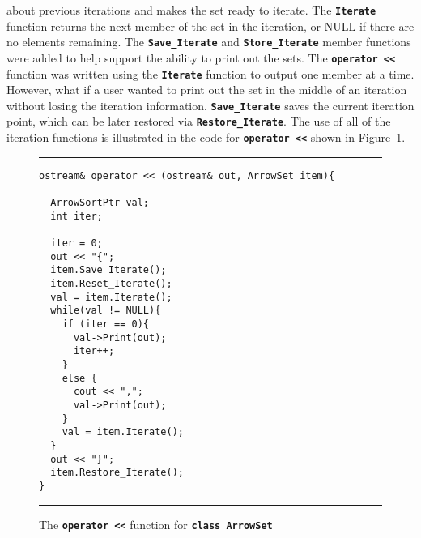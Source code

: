 \documentclass[12pt]{article} %
\newcommand{\reserved}[1]{\textbf{\texttt{#1}}} %
\newcommand{\UNSPACEFORBOX}{\vspace{-2ex}}
\newcommand{\HLINE}{\UNSPACEFORBOX%
\begin{flushleft}\rule{\textwidth}{0.01in}\end{flushleft}%
\UNSPACEFORBOX}
\newenvironment{BFIGURE}{

\begin{figure}
\small
\HLINE
}{
\HLINE
\normalsize
\end{figure}
}
\begin{document}
about previous iterations and makes the set ready to iterate. The
\reserved{Iterate} function returns the next member of the set in
the iteration, or NULL if there are no elements remaining. The
\reserved{Save\_Iterate} and \reserved{Store\_Iterate} member
functions were added to help support the ability to print out the
sets. The \reserved{operator <<} function was written using the
\reserved{Iterate} function to output one member at a time. However,
what if a user wanted to print out the set in the middle of an
iteration without losing the iteration
information. \reserved{Save\_Iterate} saves the current iteration
point, which can be later restored via
\reserved{Restore\_Iterate}. The use of all of the iteration
functions is illustrated in the code for \reserved{operator <<} shown
in Figure~\ref{oppto}.
\begin{BFIGURE}
\begin{verbatim}
ostream& operator << (ostream& out, ArrowSet item){
  
  ArrowSortPtr val;
  int iter;

  iter = 0;
  out << "{";
  item.Save_Iterate();
  item.Reset_Iterate();
  val = item.Iterate();
  while(val != NULL){
    if (iter == 0){
      val->Print(out);
      iter++;
    }
    else {
      cout << ",";
      val->Print(out);
    }
    val = item.Iterate();
  }
  out << "}";
  item.Restore_Iterate();
}
\end{verbatim}
\caption{The \reserved{operator <<} function for \reserved{class
  ArrowSet}}
\label{oppto}
\end{BFIGURE}
\end{document}
